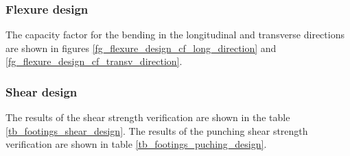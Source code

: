\subsubsection{Flexure design}
The capacity factor for the bending in the longitudinal and transverse directions are shown in figures \ref{fg_flexure_design_cf_long_direction} and \ref{fg_flexure_design_cf_transv_direction}.

\subsubsection{Shear design}
The results of the shear strength verification are shown in the table \ref{tb_footings_shear_design}. The results of the punching shear strength verification are shown in table \ref{tb_footings_puching_design}.

